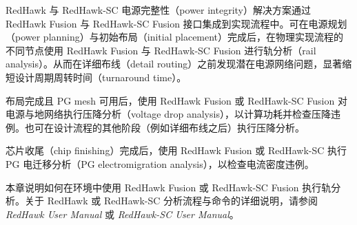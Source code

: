 \label{chap:redhawk}

RedHawk\texttrademark{} 与 RedHawk-SC\texttrademark{} 电源完整性（power integrity）解决方案通过 RedHawk Fusion 与 RedHawk-SC Fusion 接口集成到实现流程中。可在电源规划（power planning）与初始布局（initial placement）完成后，在物理实现流程的不同节点使用 RedHawk Fusion 与 RedHawk-SC Fusion 进行轨分析（rail analysis）。从而在详细布线（detail routing）之前发现潜在电源网络问题，显著缩短设计周期周转时间（turnaround time）。

布局完成且 PG mesh 可用后，使用 RedHawk Fusion 或 RedHawk-SC Fusion 对电源与地网络执行压降分析（voltage drop analysis），以计算功耗并检查压降违例。也可在设计流程的其他阶段（例如详细布线之后）执行压降分析。

芯片收尾（chip finishing）完成后，使用 RedHawk Fusion 或 RedHawk-SC 执行 PG 电迁移分析（PG electromigration analysis），以检查电流密度违例。

本章说明如何在环境中使用 RedHawk Fusion 或 RedHawk-SC Fusion 执行轨分析。关于 RedHawk 或 RedHawk-SC 分析流程与命令的详细说明，请参阅 \textit{RedHawk User Manual} 或 \textit{RedHawk-SC User Manual}。

